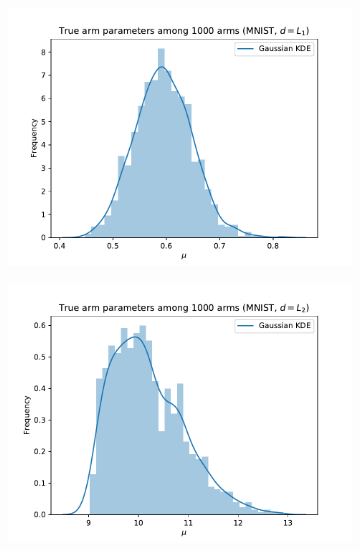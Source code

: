 \begin{figure}[ht]
\begin{subfigure}{.5\textwidth}
  \centering
  \includegraphics[width=\linewidth]{figures/mu-MNIST-COSINE.pdf}  
  \label{fig:mu_dist1}
\end{subfigure}
\begin{subfigure}{.5\textwidth}
  \centering
  \includegraphics[width=\linewidth]{figures/mu-MNIST-L2.pdf}   
  \label{fig:mu_dist2}
\end{subfigure}
\begin{subfigure}{.5\textwidth}
  \centering

\end{subfigure}
\end{figure}
